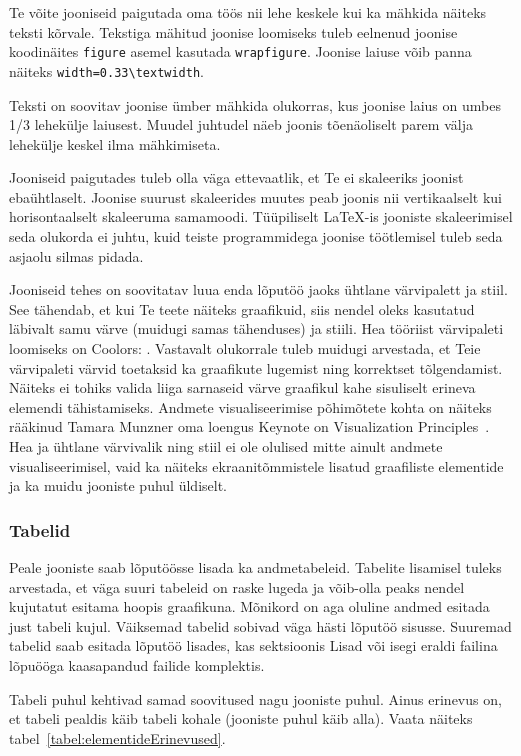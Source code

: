 Te võite jooniseid paigutada oma töös nii lehe keskele kui ka mähkida näiteks teksti kõrvale. Tekstiga mähitud joonise loomiseks tuleb eelnenud joonise koodinäites \verb|figure| asemel kasutada \verb|wrapfigure|. Joonise laiuse võib panna näiteks \verb|width=0.33\textwidth|.

Teksti on soovitav joonise ümber mähkida olukorras, kus joonise laius on umbes 1/3 lehekülje laiusest. Muudel juhtudel näeb joonis tõenäoliselt parem välja lehekülje keskel ilma mähkimiseta.

Jooniseid paigutades tuleb olla väga ettevaatlik, et Te ei skaleeriks joonist ebaühtlaselt. Joonise suurust skaleerides muutes peab joonis nii vertikaalselt kui horisontaalselt skaleeruma samamoodi. Tüüpiliselt LaTeX-is jooniste skaleerimisel seda olukorda ei juhtu, kuid teiste programmidega joonise töötlemisel tuleb seda asjaolu silmas pidada.

Jooniseid tehes on soovitatav luua enda lõputöö jaoks ühtlane värvipalett ja stiil. See tähendab, et kui Te teete näiteks graafikuid, siis nendel oleks kasutatud läbivalt samu värve (muidugi samas tähenduses) ja stiili. Hea tööriist värvipaleti loomiseks on Coolors: . Vastavalt olukorrale tuleb muidugi arvestada, et Teie värvipaleti värvid toetaksid ka graafikute lugemist ning korrektset tõlgendamist. Näiteks ei tohiks valida liiga sarnaseid värve graafikul kahe sisuliselt erineva elemendi tähistamiseks. Andmete visualiseerimise põhimõtete kohta on näiteks rääkinud Tamara Munzner oma loengus Keynote on Visualization Principles~\cite{tamara_munzner_keynote_2012}. Hea ja ühtlane värvivalik ning stiil ei ole olulised mitte ainult andmete visualiseerimisel, vaid ka näiteks ekraanitõmmistele lisatud graafiliste elementide ja ka muidu jooniste puhul üldiselt.

\subsubsection{Tabelid}
Peale jooniste saab lõputöösse lisada ka andmetabeleid. Tabelite lisamisel tuleks arvestada, et väga suuri tabeleid on raske lugeda ja võib-olla peaks nendel kujutatut esitama hoopis graafikuna. Mõnikord on aga oluline andmed esitada just tabeli kujul. Väiksemad tabelid sobivad väga hästi lõputöö sisusse. Suuremad tabelid saab esitada lõputöö lisades, kas sektsioonis Lisad või isegi eraldi failina lõpuööga kaasapandud failide komplektis.

Tabeli puhul kehtivad samad soovitused nagu jooniste puhul. Ainus erinevus on, et tabeli pealdis käib tabeli kohale (jooniste puhul käib alla). Vaata näiteks tabel~\ref{tabel:elementideErinevused}.

